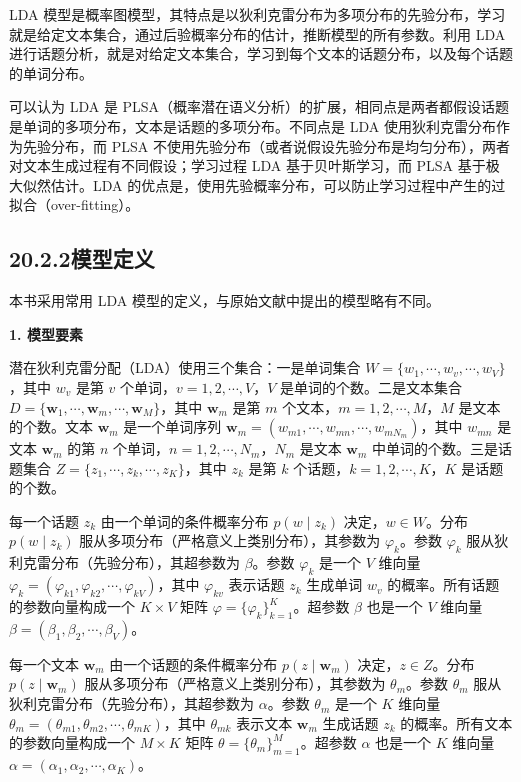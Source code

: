 \documentclass[UTF8, 12pt, fontset=fandol, oneside]{ctexart}
\begin{document}
LDA 模型是概率图模型，其特点是以狄利克雷分布为多项分布的先验分布，学习就是给定文本集合，通过后验概率分布的估计，推断模型的所有参数。利用 LDA 进行话题分析，就是对给定文本集合，学习到每个文本的话题分布，以及每个话题的单词分布。

可以认为 LDA 是 PLSA（概率潜在语义分析）的扩展，相同点是两者都假设话题是单词的多项分布，文本是话题的多项分布。不同点是 LDA 使用狄利克雷分布作为先验分布，而 PLSA 不使用先验分布（或者说假设先验分布是均匀分布），两者对文本生成过程有不同假设；学习过程 LDA 基于贝叶斯学习，而 PLSA 基于极大似然估计。LDA 的优点是，使用先验概率分布，可以防止学习过程中产生的过拟合（over-fitting）。

\subsection*{20.2.2\quad 模型定义}

本书采用常用 LDA 模型的定义，与原始文献中提出的模型略有不同。

\noindent\textbf{1. 模型要素}

潜在狄利克雷分配（LDA）使用三个集合：一是单词集合 $W=\{w_1,\cdots,w_v,\cdots,w_V\}$，其中 $w_v$ 是第 $v$ 个单词，$v=1,2,\cdots,V$，$V$ 是单词的个数。二是文本集合 $D=\{\mathbf{w}_1,\cdots,\mathbf{w}_m,\cdots,\mathbf{w}_M\}$，其中 $\mathbf{w}_m$ 是第 $m$ 个文本，$m=1,2,\cdots,M$，$M$ 是文本的个数。文本 $\mathbf{w}_m$ 是一个单词序列 $\mathbf{w}_m=(w_{m1},\cdots,w_{mn},\cdots,w_{mN_m})$，其中 $w_{mn}$ 是文本 $\mathbf{w}_m$ 的第 $n$ 个单词，$n=1,2,\cdots,N_m$，$N_m$ 是文本 $\mathbf{w}_m$ 中单词的个数。三是话题集合 $Z=\{z_1,\cdots,z_k,\cdots,z_K\}$，其中 $z_k$ 是第 $k$ 个话题，$k=1,2,\cdots,K$，$K$ 是话题的个数。

每一个话题 $z_k$ 由一个单词的条件概率分布 $p(w\mid z_k)$ 决定，$w\in W$。分布 $p(w\mid z_k)$ 服从多项分布（严格意义上类别分布），其参数为 $\varphi_k$。参数 $\varphi_k$ 服从狄利克雷分布（先验分布），其超参数为 $\beta$。参数 $\varphi_k$ 是一个 $V$ 维向量 $\varphi_k=(\varphi_{k1},\varphi_{k2},\cdots,\varphi_{kV})$，其中 $\varphi_{kv}$ 表示话题 $z_k$ 生成单词 $w_v$ 的概率。所有话题的参数向量构成一个 $K\times V$ 矩阵 $\varphi=\{\varphi_k\}_{k=1}^K$。超参数 $\beta$ 也是一个 $V$ 维向量 $\beta=(\beta_1,\beta_2,\cdots,\beta_V)$。

每一个文本 $\mathbf{w}_m$ 由一个话题的条件概率分布 $p(z\mid \mathbf{w}_m)$ 决定，$z\in Z$。分布 $p(z\mid \mathbf{w}_m)$ 服从多项分布（严格意义上类别分布），其参数为 $\theta_m$。参数 $\theta_m$ 服从狄利克雷分布（先验分布），其超参数为 $\alpha$。参数 $\theta_m$ 是一个 $K$ 维向量 $\theta_m=(\theta_{m1},\theta_{m2},\cdots,\theta_{mK})$，其中 $\theta_{mk}$ 表示文本 $\mathbf{w}_m$ 生成话题 $z_k$ 的概率。所有文本的参数向量构成一个 $M\times K$ 矩阵 $\theta=\{\theta_m\}_{m=1}^M$。超参数 $\alpha$ 也是一个 $K$ 维向量 $\alpha=(\alpha_1,\alpha_2,\cdots,\alpha_K)$。
\end{document}
